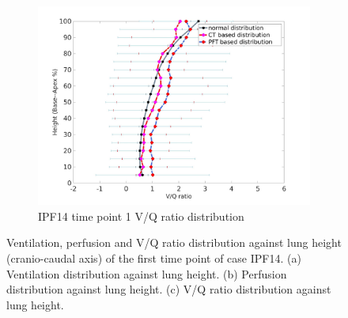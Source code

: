\begin{figure}[htbp]
\begin{subfigure}{.6\linewidth}
  \includegraphics[width=\linewidth,trim={{.0\wd0} {.0\wd0} {.0\wd0} {.0\wd0}},clip]{Appendix/Image_AppexB/IPF1401/IPF1401_VQAgainstLungHeight.png}
  \caption{IPF14 time point 1 V/Q ratio distribution}
  \label{fig:VQDistribution-c}
\end{subfigure}
\caption{ Ventilation, perfusion and V/Q ratio distribution against lung height (cranio-caudal axis) of the first time point of case IPF14. (a) Ventilation distribution against lung height. (b) Perfusion distribution against lung height. (c) V/Q ratio distribution against lung height.}
\label{fig:VQDistribution}
\end{figure}

